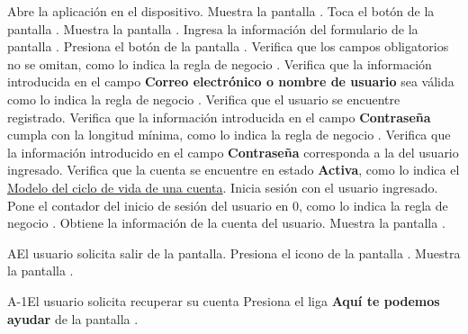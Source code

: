  \begin{UCtrayectoria}
    \UCpaso[\UCactor] Abre la aplicación en el dispositivo.
    \UCpaso[\UCsist]  Muestra la pantalla .
    \UCpaso[\UCactor] Toca el botón  de la pantalla .
    \UCpaso[\UCsist] Muestra la pantalla .
    \UCpaso[\UCactor] Ingresa la información del formulario de la pantalla . \label{cua11:tb} 
    \UCpaso[\UCactor] Presiona el botón  de la pantalla . 
    \UCpaso[\UCsist] Verifica que los campos obligatorios no se omitan, como lo indica la regla de negocio . 
    \UCpaso[\UCsist] Verifica que la información introducida en el campo \textbf{Correo electrónico o nombre de usuario} sea válida como lo indica la regla de negocio . 
    \UCpaso[\UCsist] Verifica que el usuario se encuentre registrado. 
    \UCpaso[\UCsist] Verifica que la información introducida en el campo \textbf{Contraseña} cumpla con la longitud mínima, como lo indica la regla de negocio . 
    \UCpaso[\UCsist] Verifica que la información introducido en el campo \textbf{Contraseña} corresponda a la del usuario ingresado.  \label{cua11:g1} 
    \UCpaso[\UCsist] Verifica que la cuenta se encuentre en estado \textbf{Activa}, como lo indica el \hyperlink{cv:Cuenta}{Modelo del ciclo de vida de una cuenta}. 
    \UCpaso[\UCsist] Inicia sesión con el usuario ingresado.
    \UCpaso[\UCsist] Pone el contador del inicio de sesión del usuario en 0, como lo indica la regla de negocio .
    \UCpaso[\UCsist] Obtiene la información de la cuenta del usuario.
    \UCpaso[\UCsist] Muestra la pantalla .
    
   
 \end{UCtrayectoria}
 
 \begin{UCtrayectoriaA}{A}{El usuario solicita salir de la pantalla.}
    \UCpaso[\UCactor] Presiona el icono \btnRegresar de la pantalla .
	\UCpaso[\UCsist] Muestra la pantalla . 
 \end{UCtrayectoriaA}

 \begin{UCtrayectoriaA}{A-1}{El usuario solicita recuperar su cuenta}
	\UCpaso[\UCactor] Presiona el liga \textbf{Aquí te podemos ayudar} de la pantalla .\label{cua11:pe} 
\end{UCtrayectoriaA}

